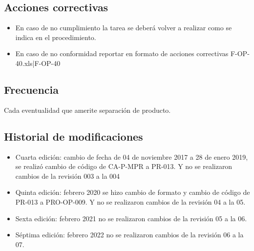 \subsection{Acciones correctivas}

\begin{itemize}
	\item En caso de no cumplimiento la tarea se deberá volver a realizar como se indica en el procedimiento.
	\item En caso de no conformidad reportar en formato de acciones correctivas F-OP-40.xls|F-OP-40
\end{itemize}

\subsection{Frecuencia}

Cada eventualidad que amerite separación de producto.

\subsection{Historial de modificaciones}

\begin{itemize}
	\item Cuarta edición: cambio de fecha de 04 de noviembre 2017 a 28 de enero 2019, se realizó cambio de código de CA-P-MPR a PR-013. Y no se realizaron cambios de la revisión 003 a la 004
	\item Quinta edición: febrero 2020 se hizo cambio de formato y cambio de código de PR-013 a PRO-OP-009. Y no se realizaron cambios de la revisión 04 a la 05.
	\item Sexta edición: febrero 2021 no se realizaron cambios de la revisión 05 a la 06.
	\item Séptima edición: febrero 2022 no se realizaron cambios de la revisión 06 a la 07.
\end{itemize}



